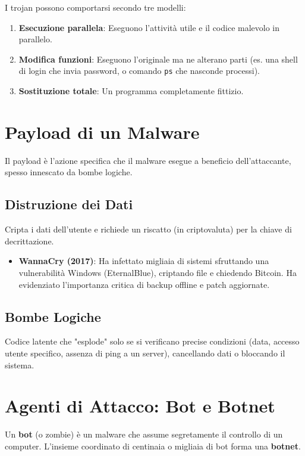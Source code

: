 \newpage
I trojan possono comportarsi secondo tre modelli:
\begin{enumerate}
    \item \textbf{Esecuzione parallela}: Eseguono l'attività utile e il codice malevolo in parallelo.
    \item \textbf{Modifica funzioni}: Eseguono l'originale ma ne alterano parti (es. una shell di login che invia password, o comando \texttt{ps} che nasconde processi).
    \item \textbf{Sostituzione totale}: Un programma completamente fittizio.
\end{enumerate}

\section{Payload di un Malware}

Il payload è l'azione specifica che il malware esegue a beneficio dell'attaccante, spesso innescato da bombe logiche.

\subsection{Distruzione dei Dati}
\begin{warnbox}[Ransomware]
Cripta i dati dell'utente e richiede un riscatto (in criptovaluta) per la chiave di decrittazione.
\begin{itemize}
    \item \textbf{WannaCry (2017)}: Ha infettato migliaia di sistemi sfruttando una vulnerabilità Windows (EternalBlue), criptando file e chiedendo Bitcoin. Ha evidenziato l'importanza critica di backup offline e patch aggiornate.
\end{itemize}
\end{warnbox}

\subsection{Bombe Logiche}
Codice latente che "esplode" solo se si verificano precise condizioni (data, accesso utente specifico, assenza di ping a un server), cancellando dati o bloccando il sistema.

\section{Agenti di Attacco: Bot e Botnet}

\begin{defbox}
Un \textbf{bot} (o zombie) è un malware che assume segretamente il controllo di un computer. L'insieme coordinato di centinaia o migliaia di bot forma una \textbf{botnet}. 
\end{defbox}

